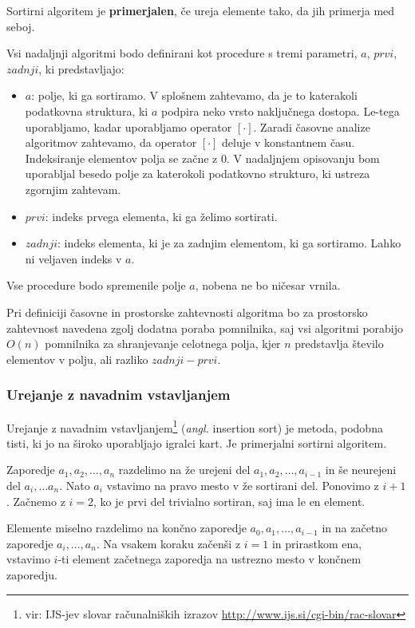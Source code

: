 \documentclass[a4paper,oneside]{article}
\begin{document}
\begin{definicija}
  Sortirni algoritem je \textbf{primerjalen}, če ureja elemente tako, da jih primerja med seboj.
\end{definicija}


Vsi nadaljnji algoritmi bodo definirani kot procedure s tremi parametri, $a$, $prvi$,
$zadnji$, ki predstavljajo:
\begin{itemize}
  \item $a$: polje, ki ga sortiramo. V splošnem zahtevamo, da je to katerakoli podatkovna
    struktura, ki $a$ podpira neko vrsto naključnega dostopa. Le-tega uporabljamo, kadar 
    uporabljamo operator $[\cdot]$. Zaradi časovne analize algoritmov zahtevamo, da operator 
    $[\cdot]$ deluje v konstantnem času. Indeksiranje elementov polja se začne z 0.
    V nadaljnjem opisovanju bom uporabljal besedo
    polje za katerokoli podatkovno strukturo, ki ustreza zgornjim zahtevam.
  \item $prvi$: indeks prvega elementa, ki ga želimo sortirati.
  \item $zadnji$: indeks elementa, ki je za zadnjim elementom, ki ga sortiramo. Lahko ni
    veljaven indeks v $a$.
\end{itemize}
Vse procedure bodo spremenile polje $a$, nobena ne bo ničesar vrnila.

Pri definiciji časovne in prostorske zahtevnosti algoritma bo za prostorsko zahtevnost 
navedena zgolj dodatna poraba pomnilnika, saj vsi algoritmi porabijo $O(n)$ pomnilnika za
shranjevanje celotnega polja, kjer $n$ predstavlja število elementov v polju, ali razliko
$zadnji - prvi$. 

\subsubsection{Urejanje z navadnim vstavljanjem}
Urejanje z navadnim vstavljanjem\footnote{vir: IJS-jev slovar računalniških izrazov
\url{http://www.ijs.si/cgi-bin/rac-slovar}} (\emph{angl.} insertion sort) je metoda,
podobna tisti, ki jo na široko uporabljajo igralci kart. Je primerjalni sortirni algoritem.

Zaporedje $a_1, a_2, \ldots, a_n$ razdelimo na že urejeni del $a_1, a_2, \ldots, a_{i-1}$
in še neurejeni del $a_i, \ldots a_n$. Nato $a_i$ vstavimo na pravo mesto v že sortirani
del. Ponovimo z $i + 1$. Začnemo z $i = 2$, ko je prvi del trivialno sortiran, saj ima le
en element.

Elemente miselno razdelimo na končno zaporedje $a_0, a_1, \ldots,
a_{i-1}$ in na začetno zaporedje $a_i,\ldots, a_n$. Na vsakem koraku začenši z $i = 1$ in
prirastkom ena, vstavimo $i$-ti element začetnega zaporedja na ustrezno mesto v končnem
zaporedju.
\end{document}
